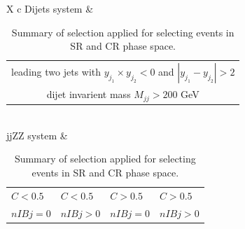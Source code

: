 \documentclass[12pt]{article}
\begin{document}
\begin{table}[ht]
\begin{tabularx}{\textwidth}{X c}
            \hline
            Dijets system & \begin{tabular}{c}leading two jets with $y_{j_1} \times y_{j_2} < 0$ and $|y_{j_1} - y_{j_2}| > 2$\\ dijet invarient mass $M_{jj} > 200$ GeV\end{tabular} \\
            \hline
            jjZZ system & \begin{tabular}{p{2cm}  p{2cm}  p{2cm}  p{2cm}} $C < 0.5$ & $C < 0.5$ & $C > 0.5$ & $C > 0.5$ \\ $nIBj = 0$ & $nIBj > 0$ & $nIBj = 0$ & $nIBj > 0$\end{tabular}\\
            \hline\hline
            \end{tabularx}
            \caption{Summary of selection applied for selecting events in SR and CR phase space.}
        \end{table}
\end{document}
